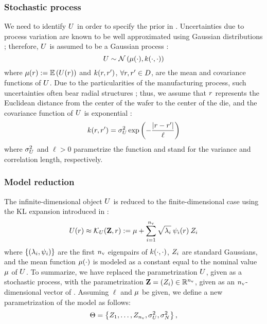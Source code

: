 \subsubsection{Stochastic process}
We need to identify $U$ in order to specify the prior in . Uncertainties due to process variation are known to be well approximated using Gaussian distributions \cite{srivastava2010}; therefore, $U$ is assumed to be a Gaussian process \cite{rasmussen2006}:
\[
  \U \sim \gaussian{\fMean{\cdot}}{\fCov{\cdot, \cdot}}
\]
where $\fMean{\r} := \E{\U(\r)}$ and $\fCov{\r, \r'}$, $\forall r, r' \in D$, are the mean and covariance functions of $U$. Due to the particularities of the manufacturing process, such uncertainties often bear radial structures \cite{cheng2011}; thus, we assume that $r$ represents the Euclidean distance from the center of the wafer to the center of the die, and the covariance function of $U$ is exponential \cite{maitre2010}:
\begin{equation} \elabel{covariance-function}
  \fCov{\r, \r'} = \param_\U^2 \exp\left(-\frac{\abs{\r - \r'}}{\ell}\right)
\end{equation}
where $\sigma_U^2$ and $\ell > 0$ parametrize the function and stand for the variance and correlation length, respectively.

\subsubsection{Model reduction}
The infinite-dimensional object $U$ is reduced to the finite-dimensional case using the KL expansion introduced in :
\begin{equation} \elabel{kl-approximation}
  \U(\r) \approx \klapprox{\U}{\vZ, \r} := \fMean + \sum_{i = 1}^\nvars \sqrt{\lambda_i} \: \klb_i(\r) \: \Z_i
\end{equation}
where $\{ (\lambda_i, \psi_i) \}$ are the first ${n_\text{v}}$ eigenpairs of $\fCov{\cdot, \cdot}$, $Z_i$ are standard Gaussians, and the mean function $\fMean{\cdot}$ is modeled as a constant equal to the nominal value $\fMean$ of $U$. To summarize, we have replaced the parametrization $U$, given as a stochastic process, with the parametrization $\mathbf{Z} = (Z_i) \in \mathbb{R}^{n_\text{v}}$, given as an ${n_\text{v}}$-dimensional vector of \rvs. Assuming $\ell$ and $\fMean$ be given, we define a new parametrization of the model as follows:
\[
  \Theta = \left\{ Z_1, \dotsc, Z_{n_\text{v}}, \sigma^2_U, \sigma^2_N \right\},
\]

